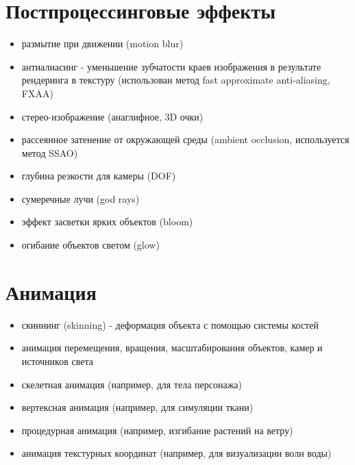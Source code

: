 \documentclass[a4paper,12pt,oneside]{sphinxmanual}
\begin{document}
\section{Постпроцессинговые эффекты}
\label{features:id8}\begin{itemize}
\item {} 
размытие при движении (motion blur)

\item {} 
антиалиасинг - уменьшение зубчатости краев изображения в результате рендеринга в текстуру (использован метод fast approximate anti-aliasing, FXAA)

\item {} 
стерео-изображение (анаглифное, 3D очки)

\item {} 
рассеянное затенение от окружающей среды (ambient occlusion, используется метод SSAO)

\item {} 
глубина резкости для камеры (DOF)

\item {} 
сумеречные лучи (god rays)

\item {} 
эффект засветки ярких объектов (bloom)

\item {} 
огибание объектов светом (glow)

\end{itemize}


\section{Анимация}
\label{features:id9}\begin{itemize}
\item {} 
скиннинг (skinning) - деформация объекта с помощью системы костей

\item {} 
анимация перемещения, вращения, масштабирования объектов, камер и источников света

\item {} 
скелетная анимация (например, для тела персонажа)

\item {} 
вертексная анимация (например, для симуляции ткани)

\item {} 
процедурная анимация (например, изгибание растений на ветру)

\item {} 
анимация текстурных координат (например, для визуализации волн воды)

\end{itemize}
\end{document}
